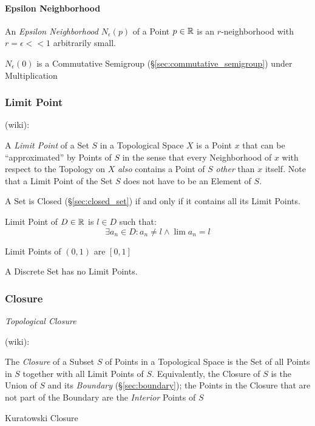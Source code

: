 \paragraph{Epsilon Neighborhood}\label{sec:epsilon_neighborhood}\hfill

An \emph{Epsilon Neighborhood} $N_\epsilon(p)$ of a Point $p \in \mathbb{R}$ is an
$r$-neighborhood with $r = \epsilon << 1$ arbitrarily small.

$N_\epsilon(0)$ is a Commutative Semigroup (\S\ref{sec:commutative_semigroup})
under Multiplication



\subsubsection{Limit Point}\label{sec:limit_point}

(wiki):

A \emph{Limit Point} of a Set $S$ in a Topological Space $X$ is a Point $x$
that can be ``approximated'' by Points of $S$ in the sense that every
Neighborhood of $x$ with respect to the Topology on $X$ \emph{also} contains a
Point of $S$ \emph{other} than $x$ itself. Note that a Limit Point of the Set
$S$ does not have to be an Element of $S$.

A Set is Closed (\S\ref{sec:closed_set}) if and only if it contains all its
Limit Points.

Limit Point of $D \in \mathbb{R}$ is $l \in D$ such that:
\[
  \exists a_n \in D : a_n \neq l \wedge \lim a_n = l
\]

Limit Points of $(0,1)$ are $[0,1]$

A Discrete Set has no Limit Points. %



\subsubsection{Closure}\label{sec:topological_closure}

\emph{Topological Closure}

(wiki):

The \emph{Closure} of a Subset $S$ of Points in a Topological Space is the Set
of all Points in $S$ together with all Limit Points of $S$. Equivalently, the
Closure of $S$ is the Union of $S$ and its \emph{Boundary}
(\S\ref{sec:boundary}); the Points in the Closure that are not part of the
Boundary are the \emph{Interior} Points of $S$

Kuratowski Closure

